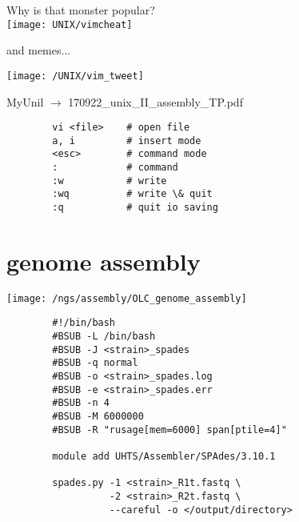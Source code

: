 \documentclass[xcolor=dvipsnames]{beamer}
\begin{document}
\begin{frame}
	\begin{center}
		\Huge
		Why is that monster popular?\\
		\vspace{1cm}
		\texttt{[image: UNIX/vimcheat]}
	\end{center}
	\hfill and memes...
\end{frame}

\begin{frame}
	\begin{center}
		\texttt{[image: /UNIX/vim\_tweet]}
	\end{center}
\end{frame}

\begin{frame}[fragile]
	\begin{center}
		\Large
		MyUnil $\rightarrow$ 170922\_unix\_II\_assembly\_TP.pdf
	\end{center}
	\Large
	\begin{verbatim}
		vi <file>    # open file
		a, i         # insert mode
		<esc>        # command mode
		:            # command
		:w           # write
		:wq          # write \& quit
		:q           # quit io saving
	\end{verbatim}
\end{frame}

\section{genome assembly}

\begin{frame}
	\begin{center}
		\texttt{[image: /ngs/assembly/OLC\_genome\_assembly]}
	\end{center}
\end{frame}

\begin{frame}[fragile]
	\begin{verbatim}
		#!/bin/bash
		#BSUB -L /bin/bash
		#BSUB -J <strain>_spades
		#BSUB -q normal
		#BSUB -o <strain>_spades.log
		#BSUB -e <strain>_spades.err
		#BSUB -n 4
		#BSUB -M 6000000
		#BSUB -R "rusage[mem=6000] span[ptile=4]"

		module add UHTS/Assembler/SPAdes/3.10.1

		spades.py -1 <strain>_R1t.fastq \
				  -2 <strain>_R2t.fastq \
				  --careful -o </output/directory>
	\end{verbatim}
\end{frame}
\end{document}
